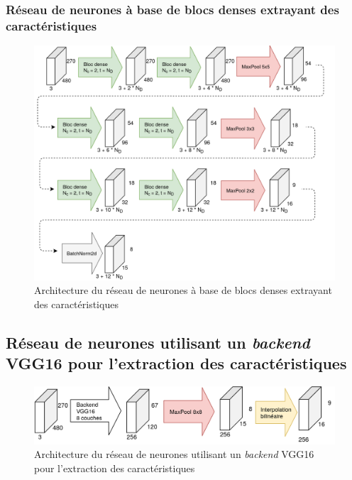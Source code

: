 \subsubsection{Réseau de neurones à base de blocs denses extrayant des caractéristiques}
    \begin{figure}[H]
        \centering
        \includegraphics[width=17cm]{images/Architecture_SmallCnnWithAutoencoderDenseBlocks.png}
        \caption{Architecture du réseau de neurones à base de blocs denses extrayant des caractéristiques}
        \label{fig:architecture_small_cnn_dense_bloc}
    \end{figure}

\subsection{Réseau de neurones utilisant un \textit{backend} VGG16 pour l'extraction des caractéristiques}
    \begin{figure}[H]
        \centering
        \includegraphics[width=12cm]{images/Architecture_Vgg16BackendAutoencoder.png}
        \caption{Architecture du réseau de neurones utilisant un \textit{backend} VGG16 pour l'extraction des caractéristiques}
        \label{fig:architecture_vgg16}
    \end{figure}